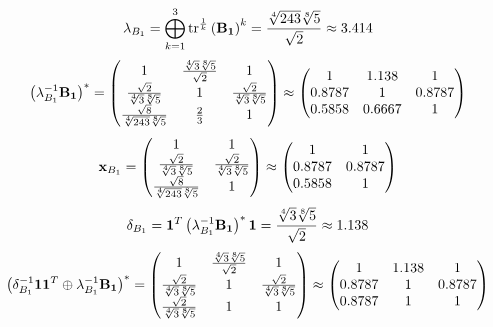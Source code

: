 \documentclass[10pt,a4paper]{article}
\begin{document}
	\[
		\lambda_{B_1} =  \bigoplus ^{3} _{k = 1} \operatorname{tr} ^{\frac 1 k} \left( \bold{B_1} \right)^k = \frac{\sqrt[4]{243}\sqrt[8]{5}} {\sqrt{2}}\approx 3.414
	\]
	\[
		\left(\lambda_{B_1}^{-1}\bold{B_1}\right)^* = 
		\begin{pmatrix}
			{1} {} & \frac{\sqrt[4]{3}\sqrt[8]{5}} {\sqrt{2}} & {1} {} \\
			\frac{\sqrt{2}} {\sqrt[4]{3}\sqrt[8]{5}} & {1} {} & \frac{\sqrt{2}} {\sqrt[4]{3}\sqrt[8]{5}} \\
			\frac{\sqrt{8}} {\sqrt[4]{243}\sqrt[8]{5}} & \frac{{2}} {{3}} & {1} {} \\
		\end{pmatrix}
		\approx
		\begin{pmatrix}
			1        & 1.138    & 1        \\
			0.8787   & 1        & 0.8787   \\
			0.5858   & 0.6667   & 1        \\
		\end{pmatrix}
	\]
	\[
		\bold{x}_{B_1} = 
		\begin{pmatrix}
			{1} {} & {1} {} \\
			\frac{\sqrt{2}} {\sqrt[4]{3}\sqrt[8]{5}} & \frac{\sqrt{2}} {\sqrt[4]{3}\sqrt[8]{5}} \\
			\frac{\sqrt{8}} {\sqrt[4]{243}\sqrt[8]{5}} & {1} {} \\
		\end{pmatrix}
		\approx
		\begin{pmatrix}
			1        & 1        \\
			0.8787   & 0.8787   \\
			0.5858   & 1        \\
		\end{pmatrix}
	\]
	\[
		\delta_{B_1} = \bold{1}^T \left(\lambda_{B_1}^{-1}\bold{B_1}\right)^* \bold{1} = \frac{\sqrt[4]{3}\sqrt[8]{5}} {\sqrt{2}}\approx 1.138
	\]
	\[
		\left(\delta_{B_1}^{-1}\bold{11}^T \oplus \lambda_{B_1}^{-1}\bold{B_1}\right)^* = 
		\begin{pmatrix}
			{1} {} & \frac{\sqrt[4]{3}\sqrt[8]{5}} {\sqrt{2}} & {1} {} \\
			\frac{\sqrt{2}} {\sqrt[4]{3}\sqrt[8]{5}} & {1} {} & \frac{\sqrt{2}} {\sqrt[4]{3}\sqrt[8]{5}} \\
			\frac{\sqrt{2}} {\sqrt[4]{3}\sqrt[8]{5}} & {1} {} & {1} {} \\
		\end{pmatrix}
		\approx
		\begin{pmatrix}
			1        & 1.138    & 1        \\
			0.8787   & 1        & 0.8787   \\
			0.8787   & 1        & 1        \\
		\end{pmatrix}
	\]
\end{document}
